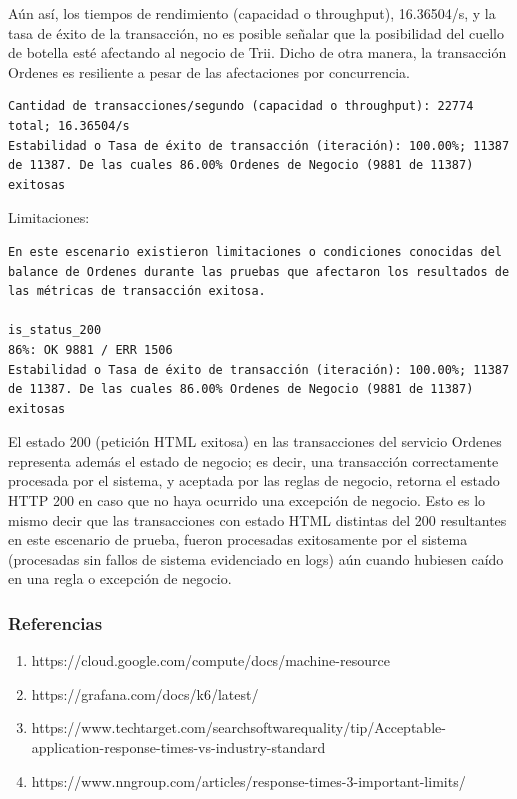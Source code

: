 \documentclass[
  paper=a4,
  ,captions=tableheading
]{scrartcl}
\providecommand{\tightlist}{%
  \setlength{\itemsep}{0pt}\setlength{\parskip}{0pt}}
\begin{document}
Aún así, los tiempos de rendimiento (capacidad o throughput),
16.36504/s, y la tasa de éxito de la transacción, no es posible señalar
que la posibilidad del cuello de botella esté afectando al negocio de
Trii. Dicho de otra manera, la transacción Ordenes es resiliente a pesar
de las afectaciones por concurrencia.

\begin{verbatim}
Cantidad de transacciones/segundo (capacidad o throughput): 22774 total; 16.36504/s
Estabilidad o Tasa de éxito de transacción (iteración): 100.00%; 11387 de 11387. De las cuales 86.00% Ordenes de Negocio (9881 de 11387) exitosas
\end{verbatim}

Limitaciones:

\begin{verbatim}
En este escenario existieron limitaciones o condiciones conocidas del balance de Ordenes durante las pruebas que afectaron los resultados de las métricas de transacción exitosa.

is_status_200
86%: OK 9881 / ERR 1506
Estabilidad o Tasa de éxito de transacción (iteración): 100.00%; 11387 de 11387. De las cuales 86.00% Ordenes de Negocio (9881 de 11387) exitosas    
\end{verbatim}

El estado 200 (petición HTML exitosa) en las transacciones del servicio
Ordenes representa además el estado de negocio; es decir, una
transacción correctamente procesada por el sistema, y aceptada por las
reglas de negocio, retorna el estado HTTP 200 en caso que no haya
ocurrido una excepción de negocio. Esto es lo mismo decir que las
transacciones con estado HTML distintas del 200 resultantes en este
escenario de prueba, fueron procesadas exitosamente por el sistema
(procesadas sin fallos de sistema evidenciado en logs) aún cuando
hubiesen caído en una regla o excepción de negocio.

\subsubsection{Referencias}\label{sec:referencias}

\begin{enumerate}
\def\labelenumi{\arabic{enumi}.}
\tightlist
\item
  https://cloud.google.com/compute/docs/machine-resource
\item
  https://grafana.com/docs/k6/latest/
\item
  https://www.techtarget.com/searchsoftwarequality/tip/Acceptable-application-response-times-vs-industry-standard
\item
  https://www.nngroup.com/articles/response-times-3-important-limits/
\end{enumerate}
\end{document}
